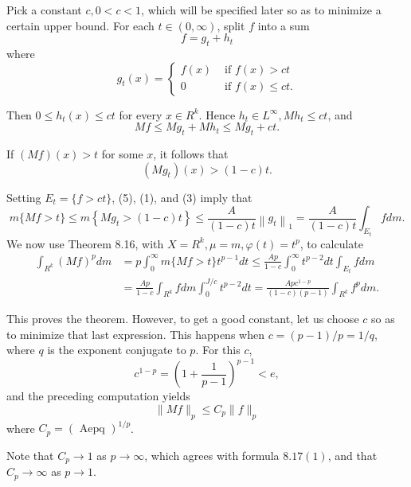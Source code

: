 Pick a constant $c, 0<c<1$, which will be specified later so as to minimize a certain upper bound. For each $t \in(0, \infty)$, split $f$ into a sum
$$
f=g_t+h_t
$$
where
$$
g_t(x)= \begin{cases}f(x) & \text { if } f(x)>c t \\ 0 & \text { if } f(x) \leq c t .\end{cases}
$$

Then $0 \leq h_t(x) \leq c t$ for every $x \in R^k$. Hence $h_t \in L^{\infty}, M h_t \leq c t$, and
$$
M f \leq M g_t+M h_t \leq M g_t+c t .
$$

If $(M f)(x)>t$ for some $x$, it follows that
$$
\left(M g_t\right)(x)>(1-c) t .
$$

Setting $E_t=\{f>c t\}$, (5), (1), and (3) imply that
$$
m\{M f>t\} \leq m\left\{M g_t>(1-c) t\right\} \leq \frac{A}{(1-c) t}\left\|g_t\right\|_1=\frac{A}{(1-c) t} \int_{E_t} f d m .
$$
We now use Theorem 8.16, with $X=R^k, \mu=m, \varphi(t)=t^p$, to calculate
$$
\begin{aligned}
\int_{R^k}(M f)^p d m & =p \int_0^{\infty} m\{M f>t\} t^{p-1} d t \leq \frac{A p}{1-c} \int_0^{\infty} t^{p-2} d t \int_{E_t} f d m \\
& =\frac{A p}{1-c} \int_{R^k} f d m \int_0^{J / c} t^{p-2} d t=\frac{A p c^{1-p}}{(1-c)(p-1)} \int_{R^k} f^p d m .
\end{aligned}
$$

This proves the theorem. However, to get a good constant, let us choose $c$ so as to minimize that last expression. This happens when $c=(p-1) / p=1 / q$, where $q$ is the exponent conjugate to $p$. For this $c$,
$$
c^{1-p}=\left(1+\frac{1}{p-1}\right)^{p-1}<e,
$$
and the preceding computation yields
$$
\|M f\|_p \leq C_p\|f\|_p
$$
where $C_p=(\text { Aepq })^{1 / p}$.


Note that $C_p \rightarrow 1$ as $p \rightarrow \infty$, which agrees with formula $8.17(1)$, and that $C_p \rightarrow \infty$ as $p \rightarrow 1$.

